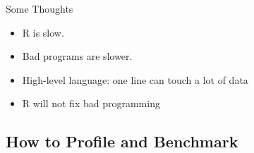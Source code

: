 \begin{frame}
  \begin{block}{Some Thoughts}
    \begin{itemize}
      \item R is slow.
      \item Bad programs are slower.
      \item High-level language: one line can touch a lot of data
      \item R will not fix bad programming
    \end{itemize}
  \end{block}
\end{frame}

\subsection{How to Profile and Benchmark}
\makesubcontentsslidessec



%

